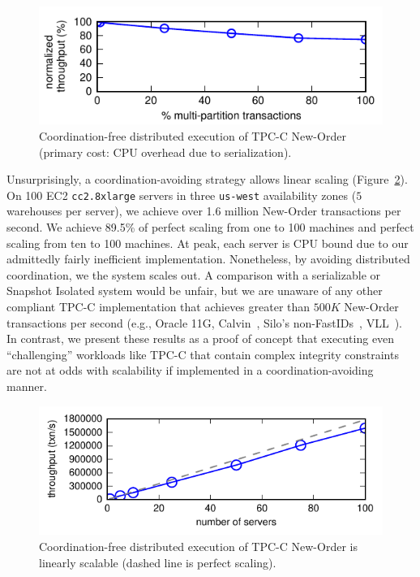 \begin{figure}
\includegraphics[width=\columnwidth]{figs/pct_thru.pdf}\vspace{-1em}
\caption{Coordination-free distributed execution of TPC-C New-Order
  (primary cost: CPU overhead due to serialization).}
\label{fig:pct}
\end{figure}

Unsurprisingly, a coordination-avoiding strategy allows linear scaling
(Figure~\ref{fig:scaleout}). On 100 EC2 \texttt{cc2.8xlarge} servers
in three \texttt{us-west} availability zones ($5$ warehouses per
server), we achieve over 1.6 million New-Order transactions per
second. We achieve 89.5\% of perfect scaling from one to 100 machines
and perfect scaling from ten to 100 machines. At peak, each server is
CPU bound due to our admittedly fairly inefficient
implementation. Nonetheless, by avoiding distributed coordination, we
the system scales out. A comparison with a serializable or Snapshot
Isolated system would be unfair, but we are unaware of any other
compliant TPC-C implementation that achieves greater than $500K$
New-Order transactions per second (e.g., Oracle 11G,
Calvin~\cite{calvin}, Silo's non-FastIDs~\cite{silo},
VLL~\cite{abadi-vll}). In contrast, we present these results as a
proof of concept that executing even ``challenging'' workloads like
TPC-C that contain complex integrity constraints are not at odds with
scalability if implemented in a coordination-avoiding manner.

\begin{figure}
\begin{center}
\includegraphics[width=\columnwidth]{figs/thru_scale.pdf}\vspace{-2em}
\end{center}
\caption{Coordination-free distributed execution of TPC-C New-Order is
  linearly scalable (dashed line is perfect scaling).}
\label{fig:scaleout}
\end{figure}

